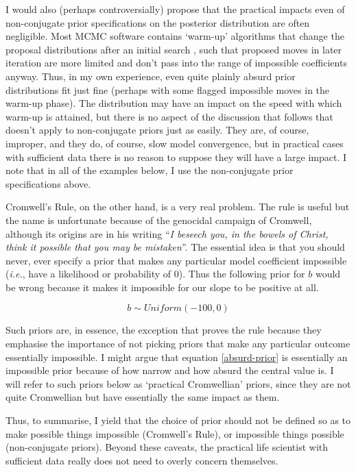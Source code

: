 \documentclass[12pt]{report}
\newcommand{\eg}{\emph{e.g.}\xspace}
\newcommand{\ie}{\emph{i.e.}\xspace}
\begin{document}
I would also (perhaps controversially) propose that the practical impacts even of non-conjugate prior specifications on the posterior distribution are often negligible. Most MCMC software contains `warm-up' algorithms that change the proposal distributions after an initial search \autocite[\eg,][]{Bouckaert2014,Carpenter2017}, such that proposed moves in later iteration are more limited and don't pass into the range of impossible coefficients anyway. Thus, in my own experience, even quite plainly absurd prior distributions fit just fine (perhaps with some flagged impossible moves in the warm-up phase). The distribution may have an impact on the speed with which warm-up is attained, but there is no aspect of the discussion that follows that doesn't apply to non-conjugate priors just as easily. They are, of course, improper, and they do, of course, slow model convergence, but in practical cases with sufficient data there is no reason to suppose they will have a large impact. I note that in all of the examples below, I use the non-conjugate prior specifications above.

Cromwell's Rule, on the other hand, is a very real problem. The rule is useful but the name is unfortunate because of the genocidal campaign of Cromwell, although its origins are in his writing ``\emph{I beseech you, in the bowels of Christ, think it possible that you may be mistaken}''. The essential idea is that you should never, ever specify a prior that makes any particular model coefficient impossible (\ie, have a likelihood or probability of 0). Thus the following prior for $b$ would be wrong because it makes it impossible for our slope to be positive at all.

\begin{equation}
  b \sim Uniform(-100, 0)
\end{equation}

Such priors are, in essence, the exception that proves the rule because they emphasise the importance of not picking priors that make any particular outcome essentially impossible. I might argue that equation \ref{absurd-prior} is essentially an impossible prior because of how narrow and how absurd the central value is. I will refer to such priors below as `practical Cromwellian' priors, since they are not quite Cromwellian but have essentially the same impact as them.

Thus, to summarise, I yield that the choice of prior should not be defined so as to make possible things impossible (Cromwell's Rule), or impossible things possible (non-conjugate priors). Beyond these caveats, the practical life scientist with sufficient data really does not need to overly concern themselves.
\end{document}
